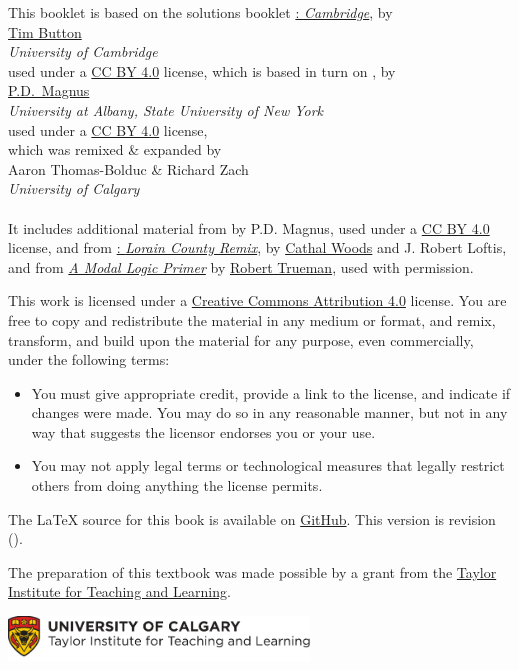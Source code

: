\noindent This booklet is based on the solutions booklet \href{http://people.ds.cam.ac.uk/tecb2/forallx.shtml}{\forallx: \emph{Cambridge}}, by\\[2ex]
\href{http://people.ds.cam.ac.uk/tecb2/index.shtml}{Tim Button}\\
\emph{University of Cambridge}\\[2ex]
used under a \href{https://creativecommons.org/licenses/by/4.0/}{CC BY 4.0} license, which is based in turn on \href{https://www.fecundity.com/logic/}{\forallx}, by\\[2ex]
\href{https://www.fecundity.com/job/}{P.D.\ Magnus}\\
\emph{University at Albany, State University of New York}\\[2ex]
used under a \href{https://creativecommons.org/licenses/by/4.0/}{CC BY 4.0} license,
\\
which was remixed \& expanded by\\[2ex] {Aaron Thomas-Bolduc \& Richard Zach}\\
\emph{University of Calgary}
\\
\\
It includes additional material from \forallx{} by P.D. Magnus, used
under a \href{https://creativecommons.org/licenses/by/4.0/}{CC BY 4.0}
license, and
from \href{https://github.com/rob-helpy-chalk/openintroduction}{\forallx: \emph{Lorain
County Remix}},
by \href{https://sites.google.com/site/cathalwoods/}{Cathal Woods} and
J. Robert Loftis, and from
\href{http://www.rtrueman.com/uploads/7/0/3/2/70324387/modal_logic_primer.pdf}{\emph{A Modal Logic Primer}} by \href{http://www.rtrueman.com/}{Robert
Trueman}, used with permission.

\bigskip

\noindent This work is licensed under a \href{https://creativecommons.org/licenses/by/4.0/}{Creative Commons Attribution 4.0} license. 
You are free to copy and redistribute the material in any medium or format, and  remix, transform, and build upon the material for any purpose, even commercially, under the following terms:
\begin{itemize}
\item You must give appropriate credit, provide a link to the license, and indicate if changes were made. You may do so in any reasonable manner, but not in any way that suggests the licensor endorses you or your use.
\item You may not apply legal terms or technological measures that legally restrict others from doing anything the license permits.
\end{itemize}
The \LaTeX{} source for this book is available on \href{https://github.com/rzach/forallx-yyc/}{GitHub}. This version
is revision \gitAbbrevHash{} (\gitAuthorDate).


\bigskip
\noindent The preparation of this textbook was made possible by a grant from the \href{http://www.ucalgary.ca/taylorinstitute/}{Taylor Institute for Teaching and Learning}.

\bigskip
\noindent
\href{http://www.ucalgary.ca/taylorinstitute/}{\includegraphics[width=8cm]{../assets/ti-color}}
